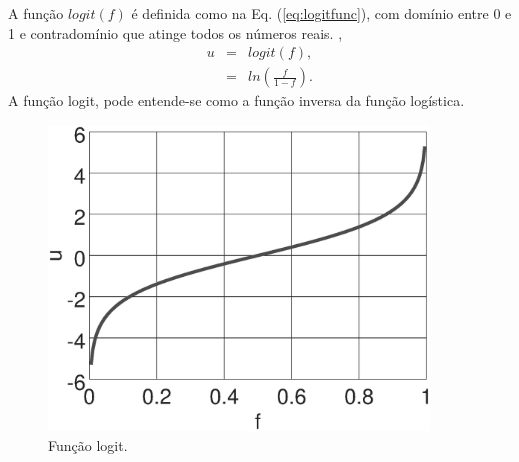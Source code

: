 
\noindent
\begin{minipage}{0.5\textwidth}
\begin{definition}\label{def:logitfunc}
A função $logit(f)$ é definida como na Eq. (\ref{eq:logitfunc}), 
com domínio entre 0 e 1 e 
contradomínio que atinge todos os números reais. \cite[pp. 17]{kleinbaum2010logistic},
\begin{equation}\label{eq:logitfunc}
\begin{matrix}
u & = & logit(f),\\
~ & = & ln\left( \frac{f}{1-f}\right).
\end{matrix}
\end{equation}
A função logit, pode entende-se como a função inversa da função logística.
\end{definition}
\end{minipage}
\begin{minipage}{0.5\textwidth}
     \begin{figure}[H]
         \centering
         \includegraphics[width=0.9\textwidth]{chapters/classificacao/mfiles/logisticfunc/logit.eps}
         \caption{Função logit. }
         \label{fig:logitfunc}
     \end{figure}
\end{minipage}
